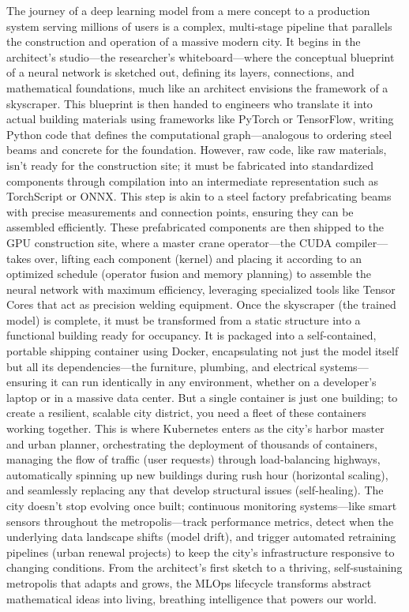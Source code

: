 \documentclass[11pt]{article}
\begin{document}
The journey of a deep learning model from a mere concept to a production system serving millions of users is a complex, multi-stage pipeline that parallels the construction and operation of a massive modern city. It begins in the architect's studio—the researcher's whiteboard—where the conceptual blueprint of a neural network is sketched out, defining its layers, connections, and mathematical foundations, much like an architect envisions the framework  of a skyscraper. This blueprint is then handed to engineers who translate it into actual building materials using frameworks like PyTorch or TensorFlow, writing Python code that defines the computational graph—analogous to ordering steel beams and concrete for the foundation. However, raw code, like raw materials, isn't ready for the construction site; it must be fabricated into standardized components through compilation into an intermediate representation such as TorchScript or ONNX. This step is akin to a steel factory prefabricating beams with precise measurements and connection points, ensuring they can be assembled efficiently. These prefabricated components are then shipped to the GPU construction site, where a master crane operator—the CUDA compiler—takes over, lifting each component (kernel) and placing it according to an optimized schedule (operator fusion and memory planning) to assemble the neural network with maximum efficiency, leveraging specialized tools like Tensor Cores that act as precision welding equipment. Once the skyscraper (the trained model) is complete, it must be transformed from a static structure into a functional building ready for occupancy. It is packaged into a self-contained, portable shipping container using Docker, encapsulating not just the model itself but all its dependencies—the furniture, plumbing, and electrical systems—ensuring it can run identically in any environment, whether on a developer's laptop or in a massive data center. But a single container is just one building; to create a resilient, scalable city district, you need a fleet of these containers working together. This is where Kubernetes enters as the city's harbor master and urban planner, orchestrating the deployment of thousands of containers, managing the flow of traffic (user requests) through load-balancing highways, automatically spinning up new buildings during rush hour (horizontal scaling), and seamlessly replacing any that develop structural issues (self-healing). The city doesn't stop evolving once built; continuous monitoring systems—like smart sensors throughout the metropolis—track performance metrics, detect when the underlying data landscape shifts (model drift), and trigger automated retraining pipelines (urban renewal projects) to keep the city's infrastructure responsive to changing conditions. From the architect's first sketch to a thriving, self-sustaining metropolis that adapts and grows, the MLOps lifecycle transforms abstract mathematical ideas into living, breathing intelligence that powers our world.
\end{document}
